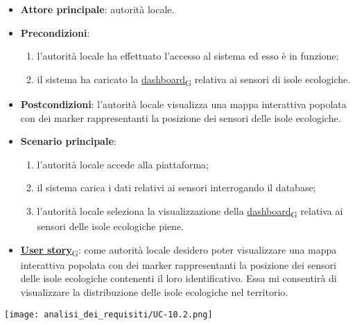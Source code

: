 \newpage

\begin{itemize}
	\item \textbf{Attore principale}: autorità locale.
	\item \textbf{Precondizioni}:
	      \begin{enumerate}
		      \item l'autorità locale ha effettuato l'accesso al sistema ed esso è in funzione;
		      \item il sistema ha caricato la \href{https://7last.github.io/docs/rtb/documentazione-interna/glossario\#dashboard}{dashboard\textsubscript{G}} relativa ai sensori di isole ecologiche.
	      \end{enumerate}
	\item \textbf{Postcondizioni}: l'autorità locale visualizza una mappa interattiva popolata con dei marker rappresentanti la posizione dei sensori delle isole ecologiche.
	\item \textbf{Scenario principale}:
	      \begin{enumerate}
		      \item l'autorità locale accede alla piattaforma;
		      \item il sistema carica i dati relativi ai sensori interrogando il database;
		      \item l'autorità locale seleziona la visualizzazione della \href{https://7last.github.io/docs/rtb/documentazione-interna/glossario\#dashboard}{dashboard\textsubscript{G}} relativa ai sensori delle isole ecologiche piene.
	      \end{enumerate}
	\item \href{https://7last.github.io/docs/rtb/documentazione-interna/glossario\#user-story}{\textbf{User story}\textsubscript{G}}:
	      come autorità locale desidero poter visualizzare una mappa interattiva popolata con dei marker rappresentanti la posizione dei sensori delle isole ecologiche
	      contenenti il loro identificativo. Essa mi consentirà di visualizzare la distribuzione delle isole ecologiche nel territorio.
\end{itemize}
\begin{center}
	\texttt{[image: analisi\_dei\_requisiti/UC-10.2.png]}
\end{center}

\newpage

